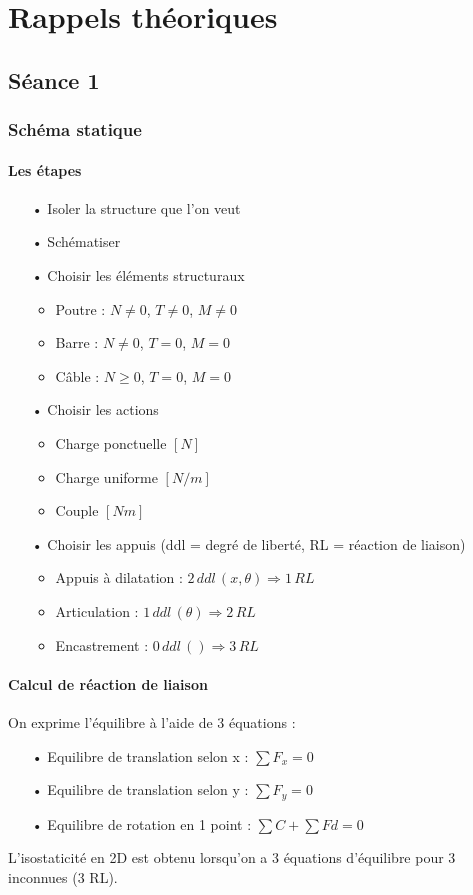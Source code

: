 
\chapter{Rappels théoriques}
\section*{Séance 1}
	\subsection*{Schéma statique}
		\subsubsection{Les étapes}
		\begin{itemize}
			\item[•] Isoler la structure que l'on veut
			\item[•] Schématiser
			\item[•] Choisir les éléments structuraux
			\begin{itemize}
				\item Poutre : $N \neq 0$, $T\neq 0$, $M\neq 0$
				\item Barre : $N \neq 0$, $T = 0$, $M = 0$
				\item Câble : $N \geq 0$, $T = 0$, $M = 0$
			\end{itemize}
			\item[•] Choisir les actions
			\begin{itemize}
				\item Charge ponctuelle $[N]$
				\item Charge uniforme $[N/m]$
				\item Couple $[Nm]$
			\end{itemize}
			\item[•] Choisir les appuis (ddl = degré de liberté, RL = réaction de liaison)
			\begin{itemize}
				\item Appuis à dilatation : $2 \, ddl\, (x, \theta)\Rightarrow 1\, RL$
				\item Articulation : $1 \, ddl\, (\theta)\Rightarrow 2\, RL$
				\item Encastrement : $0 \, ddl\, ( )\Rightarrow 3\, RL$
			\end{itemize}
		\end{itemize}
		
		\subsubsection{Calcul de réaction de liaison}
		On exprime l'équilibre à l'aide de 3 équations :
		\begin{itemize}
			\item[•] Equilibre de translation selon x : $\sum F_x = 0$
			\item[•] Equilibre de translation selon y : $\sum F_y = 0$
			\item[•] Equilibre de rotation en 1 point : $\sum C + \sum Fd = 0$
		\end{itemize}
		L'isostaticité en 2D est obtenu lorsqu'on a 3 équations d'équilibre pour 3 inconnues (3 RL).
		
